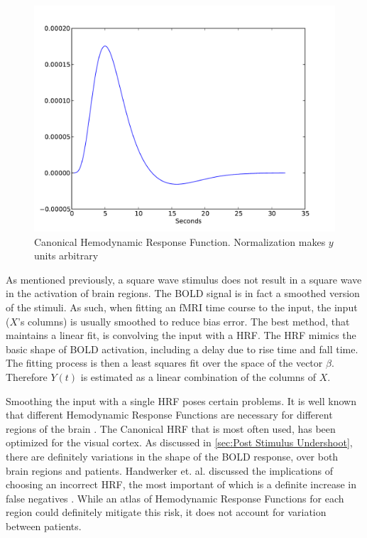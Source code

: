 \begin{figure}
\centering
\includegraphics[scale=.7]{images/HRF}
\caption[Canonical Hemodynamic Response Function]
{Canonical Hemodynamic Response Function. Normalization makes $y$ units
arbitrary}
\label{fig:HRF}
\end{figure}

As mentioned previously, a square wave stimulus 
does not result in a square wave in the activation of brain regions. 
The \ac{BOLD} signal is in fact a smoothed version of the 
stimuli. As such, when fitting an \ac{fMRI} time course to the input,
the input ($X$'s columns) is usually smoothed to reduce bias error. 
The best method, that maintains a linear fit, is convolving the input 
with a \ac{HRF}. The \ac{HRF}
mimics the basic shape of \ac{BOLD} activation, including a delay
due to rise time and fall time. The fitting 
process is then a least squares fit over the space of the vector $\beta$. 
Therefore $Y(t)$ is estimated as a linear combination 
of the columns of $X$. 

Smoothing the input with a single \ac{HRF} poses certain problems.
It is well known that different Hemodynamic Response Functions are necessary 
for different regions of the brain \cite{Handwerker2004}. The Canonical 
\ac{HRF} that is most often used, 
has been optimized for the visual cortex. As discussed in \autoref{sec:Post Stimulus Undershoot},
there are definitely variations in the shape of the
\ac{BOLD} response, over both brain regions and patients. Handwerker et. al. 
discussed the implications of choosing an incorrect \ac{HRF}, the most important
of which is a definite increase in false negatives \cite{Handwerker2004}. While an atlas
of Hemodynamic Response Functions for each region could definitely 
mitigate this risk, it does not account for variation between patients.

